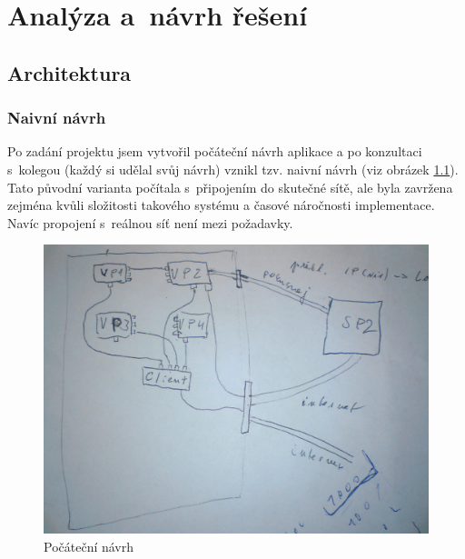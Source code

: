 \chapter{Analýza a~návrh řešení}\label{kap:analyza}



\section{Architektura}

\subsection{Naivní návrh}
Po zadání projektu jsem vytvořil počáteční návrh aplikace a po konzultaci s~kolegou (každý si udělal svůj návrh) vznikl tzv. naivní návrh (viz obrázek \ref{fig:navrh}). Tato původní varianta počítala s~připojením do skutečné sítě, ale byla zavržena zejména kvůli složitosti takového systému a časové náročnosti implementace. Navíc propojení s~reálnou síť není mezi požadavky.

\begin{figure}[h]
\begin{center}
\includegraphics[width=12cm]{figures/navrh}
\caption{Počáteční návrh}
\label{fig:navrh}
\end{center}
\end{figure}

